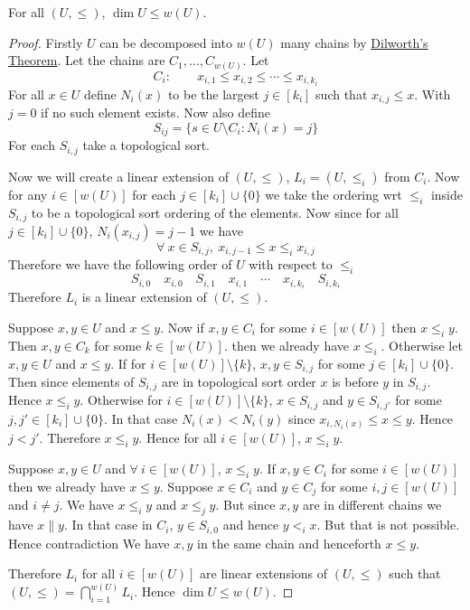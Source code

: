 \documentclass[twoside]{article}
\begin{document}
\begin{Theorem}{}{}
	For all $(U,\leq)$, $\dim U\leq w(U)$.
\end{Theorem}
\begin{proof}
	Firstly $U$ can be decomposed into $w(U)$ many chains by \hyperref[th:dilworth]{Dilworth's Theorem}. Let the chains are $C_1,\dots, C_{w(U)}$. Let $$C_i:\qquad x_{i,1}\leq x_{i,2}\leq\cdots\leq x_{i,k_i}$$For all $x\in U$ define $N_i(x)$ to be the largest $j\in[k_i]$ such that $x_{i,j}\leq x$. With $j=0$ if no such element exists. Now also define $$S_{ij}=\{s\in U\setminus C_i\colon N_i(x)=j\}$$For each $S_{i,j}$ take a topological sort. 
	
	Now we will create a linear extension of $(U,\leq )$, $L_i=(U,\leq_i)$ from $C_i$. Now for any $i\in[w(U)]$ for each $j\in[k_i]\cup\{0\}$ we take the ordering wrt $\leq_i$ inside $S_{i,j}$ to be a topological sort ordering of the elements. Now	since for all $j\in[k_i]\cup\{0\}$, $N_i(x_{i,j})=j-1$ we have $$\forall\ x\in S_{i,j},\ x_{i,j-1}\leq x\leq_i x_{i,j}$$ Therefore we have the following order of $U$ with respect to $\leq_i$ $$S_{i,0}\quad x_{i,0} \quad S_{i,1}\quad x_{i,1}\quad\cdots\quad x_{i,k_i}\quad S_{i,k_i}$$Therefore $L_i$ is a linear extension of $(U,\leq)$. 
	
	Suppose $x,y\in U$ and $x\leq y$. Now if $x,y\in C_i$ for some $i\in [w(U)]$ then $x\leq_i y$. Then $x,y\in C_k$ for some $k\in[w(U)]$. then we already have $x\leq_i$. Otherwise let $x,y\in U$ and $x\leq y$. If for $i\in[w(U)]\setminus\{k\}$, $x,y\in S_{i,j}$ for some $j\in[k_i]\cup\{0\}$.  Then since elements of $S_{i,j}$ are in topological sort order $x$ is before $y$ in $S_{i,j}$. Hence $x\leq_i y$. Otherwise for $i\in [w(U)]\setminus\{k\}$, $x\in S_{i,j}$ and $y\in S_{i,j'}$ for some $j,j'\in[k_i]\cup\{0\}$. In that case $N_i(x)< N_i(y)$ since $x_{i,N_i(x)}\leq x\leq y$. Hence $j<j'$. Therefore $x\leq_i y$. Hence for all $i\in[w(U)]$, $x\leq_i y$. 
	
	Suppose $x,y\in U$ and $\forall\ i\in[w(U)]$, $x\leq_i y$. If $x,y\in C_i$ for some $i\in[w(U)]$ then we already have $x\leq y$. Suppose $x\in C_i$ and $y\in C_j$ for some $i,j\in[w(U)]$ and $i\neq j$. We have $x\leq_i y$ and $x\leq_j y$. But since $x,y$ are in different chains we have $x\| y$. In that case in $C_i$, $y\in S_{i,0}$ and hence $y<_i x$. But that is not possible. Hence contradiction \ctr We have $x,y$ in the same chain and henceforth $x\leq y$. 
	
	Therefore $L_i$ for all $i\in [w(U)]$ are linear extensions of $(U,\leq)$ such that  $(U,\leq)=\bigcap\limits_{i=1}^{w(U)}L_i$. Hence $\dim U\leq w(U)$. 
\end{proof}
\end{document}
